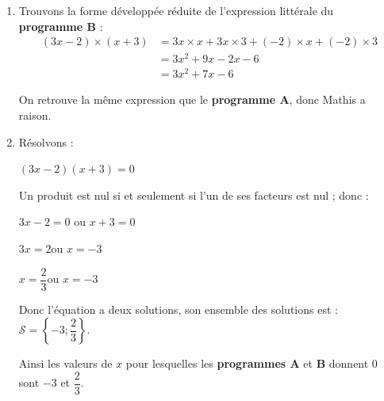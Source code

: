 \begin{enumerate}
	\item Trouvons la forme développée réduite de l'expression littérale du \textbf{programme B} :
	\begin{align*}
	(3x-2)\times (x+3)&=3x\times x+3x\times 3+(-2)\times x+(-2)\times 3\\
	&=3x^2+9x-2x-6\\
	&=3x^2+7x-6
	\end{align*}

	On retrouve la même expression que le \textbf{programme A}, donc Mathis a raison.

	\item Résolvons :
	\begin{center}
	$(3x-2)(x+3) = 0$

	Un produit est nul si et seulement si l'un de ses facteurs est nul ; donc :

	$3x-2=0$ \quad ou \quad $x+3=0$

	$3x=2$\quad ou \quad $x=-3$

	$x=\dfrac{2}{3}$\quad ou \quad $x=-3$
	\end{center}

	Donc l'équation a deux solutions, son ensemble des solutions est :\quad $\mathcal{S}=\left\{-3 ;\dfrac{2}{3} \right\}$.


	Ainsi les valeurs de $x$ pour lesquelles les \textbf{programmes A} et \textbf{B} donnent 0 sont $-3$ et $\dfrac{2}{3}$.
\end{enumerate}
